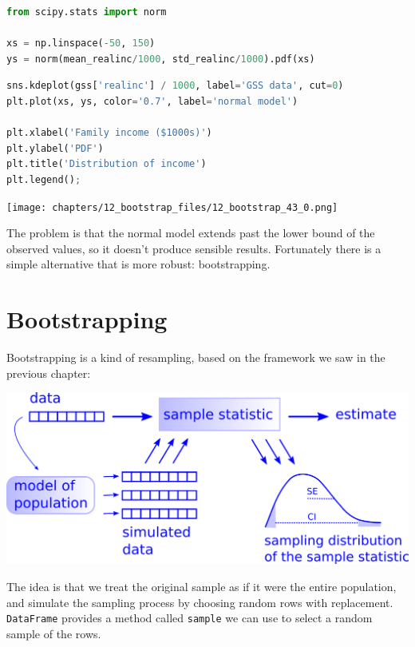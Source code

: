 \begin{lstlisting}[language=Python,style=source]
from scipy.stats import norm

xs = np.linspace(-50, 150)
ys = norm(mean_realinc/1000, std_realinc/1000).pdf(xs)
\end{lstlisting}

\begin{lstlisting}[language=Python,style=source]
sns.kdeplot(gss['realinc'] / 1000, label='GSS data', cut=0)
plt.plot(xs, ys, color='0.7', label='normal model')

plt.xlabel('Family income ($1000s)')
plt.ylabel('PDF')
plt.title('Distribution of income')
plt.legend();
\end{lstlisting}

\begin{center}
\texttt{[image: chapters/12\_bootstrap\_files/12\_bootstrap\_43\_0.png]}
\end{center}

The problem is that the normal model extends past the lower bound of the
observed values, so it doesn't produce sensible results. Fortunately
there is a simple alternative that is more robust: bootstrapping.

\section{Bootstrapping}\label{bootstrapping}

Bootstrapping is a kind of resampling, based on the framework we saw in
the previous chapter:

\includegraphics{chapters/figs/resampling.png}

The idea is that we treat the original sample as if it were the entire
population, and simulate the sampling process by choosing random rows
with replacement. \passthrough{\lstinline!DataFrame!} provides a method
called \passthrough{\lstinline!sample!} we can use to select a random
sample of the rows.

